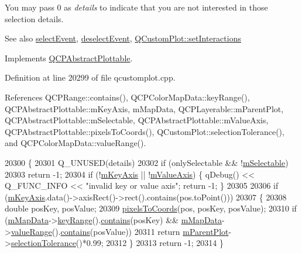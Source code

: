 You may pass 0 as {\itshape details} to indicate that you are not interested in those selection details.

\begin{DoxySeeAlso}{See also}
\hyperlink{class_q_c_p_abstract_plottable_a16aaad02456aa23a759efd1ac90c79bf}{select\+Event}, \hyperlink{class_q_c_p_abstract_plottable_a6fa0d0f95560ea8b01ee13f296dab2b1}{deselect\+Event}, \hyperlink{class_q_custom_plot_a5ee1e2f6ae27419deca53e75907c27e5}{Q\+Custom\+Plot\+::set\+Interactions} 
\end{DoxySeeAlso}


Implements \hyperlink{class_q_c_p_abstract_plottable_a38efe9641d972992a3d44204bc80ec1d}{Q\+C\+P\+Abstract\+Plottable}.



Definition at line 20299 of file qcustomplot.\+cpp.



References Q\+C\+P\+Range\+::contains(), Q\+C\+P\+Color\+Map\+Data\+::key\+Range(), Q\+C\+P\+Abstract\+Plottable\+::m\+Key\+Axis, m\+Map\+Data, Q\+C\+P\+Layerable\+::m\+Parent\+Plot, Q\+C\+P\+Abstract\+Plottable\+::m\+Selectable, Q\+C\+P\+Abstract\+Plottable\+::m\+Value\+Axis, Q\+C\+P\+Abstract\+Plottable\+::pixels\+To\+Coords(), Q\+Custom\+Plot\+::selection\+Tolerance(), and Q\+C\+P\+Color\+Map\+Data\+::value\+Range().


\begin{DoxyCode}
20300 \{
20301   Q\_UNUSED(details)
20302   if (onlySelectable && !\hyperlink{class_q_c_p_abstract_plottable_aceee52342c8e75727abcbd164986fdcb}{mSelectable})
20303     return -1;
20304   if (!\hyperlink{class_q_c_p_abstract_plottable_a426f42e254d0f8ce5436a868c61a6827}{mKeyAxis} || !\hyperlink{class_q_c_p_abstract_plottable_a2901452ca4aea911a1827717934a4bda}{mValueAxis}) \{ qDebug() << Q\_FUNC\_INFO << \textcolor{stringliteral}{"invalid key or value axis"};
       \textcolor{keywordflow}{return} -1; \}
20305   
20306   \textcolor{keywordflow}{if} (\hyperlink{class_q_c_p_abstract_plottable_a426f42e254d0f8ce5436a868c61a6827}{mKeyAxis}.data()->axisRect()->rect().contains(pos.toPoint()))
20307   \{
20308     \textcolor{keywordtype}{double} posKey, posValue;
20309     \hyperlink{class_q_c_p_abstract_plottable_a10408828446e9e0681c46d65120f382e}{pixelsToCoords}(pos, posKey, posValue);
20310     \textcolor{keywordflow}{if} (\hyperlink{class_q_c_p_color_map_a8709272aa8f0be3ca111bf3866806f8b}{mMapData}->\hyperlink{class_q_c_p_color_map_data_a4765180639742460f64ab6c97c745c08}{keyRange}().\hyperlink{class_q_c_p_range_a030ce95b527c32e01414d0351347b46d}{contains}(posKey) && 
      \hyperlink{class_q_c_p_color_map_a8709272aa8f0be3ca111bf3866806f8b}{mMapData}->\hyperlink{class_q_c_p_color_map_data_a025be4d7ba0494fd7b38a5a56c737f2a}{valueRange}().\hyperlink{class_q_c_p_range_a030ce95b527c32e01414d0351347b46d}{contains}(posValue))
20311       \textcolor{keywordflow}{return} \hyperlink{class_q_c_p_layerable_aa2a528433e44db02b8aef23c1f9f90ed}{mParentPlot}->\hyperlink{class_q_custom_plot_a7b738074c75e80070ef6a10263c6cd69}{selectionTolerance}()*0.99;
20312   \}
20313   \textcolor{keywordflow}{return} -1;
20314 \}
\end{DoxyCode}


